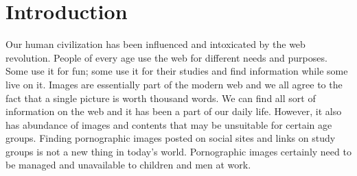 
\chapter{Introduction}
\setcounter{page}{1}
Our human civilization has been influenced and intoxicated by the web revolution. People of every age use the web for different needs and purposes. Some use it for fun; some use it for their studies and find information while some live on it. Images are essentially part of the modern web and we all agree to the fact that a single picture is worth thousand words. We can find all sort of information on the web and it has been a part of our daily life. However, it also has abundance of images and contents that may be unsuitable for certain age groups. Finding pornographic images posted on social sites and links on study groups is not a new thing in today’s world. Pornographic images certainly need to be managed and unavailable to children and men at work.  

%
